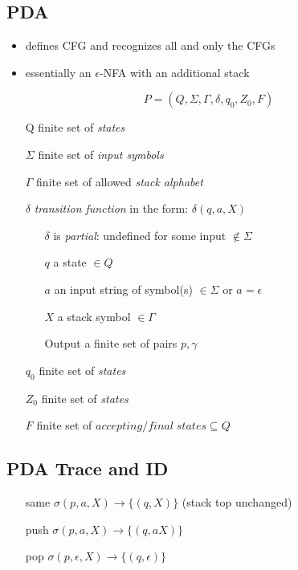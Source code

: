 \documentclass[10pt,a4paper,landscape]{article}
\begin{document}
\begin{multicols*}{3}
\section*{PDA}
\begin{itemize}
\item defines CFG and recognizes all and only the CFGs
\item essentially an \(\epsilon\)-NFA with an additional stack
\end{itemize}
\[ P = (Q,\Sigma,\Gamma,\delta,q_{0},Z_{0},F) \]
\begin{itemize}
\item[Q] finite set of \emph{states}
\item[\(\Sigma\)] finite set of \emph{input symbols}
\item[\(\Gamma\)] finite set of allowed \emph{stack alphabet}
\item[\(\delta\)] \emph{transition function} in the form: \(\delta(q,a,X)\)
  \begin{itemize}[leftmargin=1em,labelindent=2em]
  \item[$\delta$] is \emph{partial}: undefined for some input \(\notin \Sigma\)
  \item[$q$] a state \(\in Q\)
  \item[$a$] an input string of symbol(s) \(\in \Sigma\) or \(a = \epsilon\)
  \item[$X$] a stack symbol \(\in \Gamma \)
  \item[] Output a finite set of pairs \(p, \gamma\)
  \end{itemize}
\item[$q_{0}$] finite set of \emph{states}
\item[$Z_{0}$] finite set of \emph{states}
\item[$F$] finite set of \(accepting/final\; states \subseteq Q\)
\end{itemize}
\subsection*{PDA Trace and ID}
\begin{enumerate}[leftmargin=2.5em,labelindent=2em]
\item [same] \(\sigma(p,a,X) \rightarrow \{(q,X)\}\) (stack top unchanged)
\item [push] \(\sigma(p,a,X) \rightarrow \{(q,aX)\}\)
\item [pop]  \(\sigma(p,\epsilon,X) \rightarrow \{(q,\epsilon)\}\)
\end{enumerate}

\end{multicols*}
\end{document}
